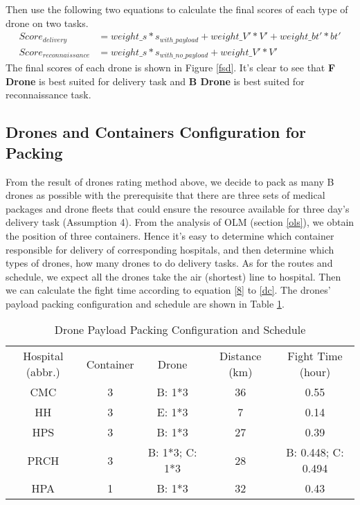 \documentclass{mcmthesis}
\begin{document}
	Then use the following two equations to calculate the final scores of each type of drone on two tasks.
	\begin{align}
	Score_{delivery}&=weight\_s * s_{with\_payload} + weight\_V' * V' + weight\_bt' * bt' \\
	Score_{reconnaissance}&=weight\_s * s_{with\_no\_payload} + weight\_V' * V'
	\end{align}
	The final scores of each drone is shown in Figure \ref{fsd}. It's clear to see that \textbf{F Drone} is best suited for delivery task and \textbf{B Drone} is best suited for reconnaissance task.
	
	\subsection {Drones and Containers  Configuration for Packing}
	From the result of drones rating method above, we decide to pack as many B drones as possible with the prerequisite that there are three sets of medical packages and drone fleets that could ensure the resource available for three day's delivery task (Assumption 4). From the analysis of OLM (section \ref{ols}), we obtain the position of three containers. Hence it's easy to determine which container responsible for delivery of corresponding hospitals, and then determine which types of drones, how many drones to do delivery tasks. As for the routes and schedule, we expect all the drones take the air (shortest) line to hospital. Then we can calculate the fight time according to equation \ref{8} to \ref{dc}. The drones' payload packing configuration and schedule are shown in Table \ref{dcp}. 
	\begin{table}[H]
		\centering
		
		\begin{tabular}{lllcc}
			\cline{1-5}
			
			\multicolumn{1}{c}{Hospital (abbr.)}  & \multicolumn{1}{c}{Container}         & \multicolumn{1}{c}{Drone} & \multicolumn{1}{c}{Distance (km)}     & \multicolumn{1}{c}{Fight Time (hour)} \\
			\cline{1-5}
			
			\multicolumn{1}{c}{CMC}  & \multicolumn{1}{c}{3}  &\multicolumn{1}{c}{B: 1*3}    & 36 & 0.55   \\
			\multicolumn{1}{c}{HH}   & \multicolumn{1}{c}{3}  &\multicolumn{1}{c}{E: 1*3}    & 7 &  0.14  \\
			\multicolumn{1}{c}{HPS}  & \multicolumn{1}{c}{3}  &\multicolumn{1}{c}{B: 1*3}  & 27 & 0.39 \\ 
 			\multicolumn{1}{c}{PRCH} & \multicolumn{1}{c}{3}  &\multicolumn{1}{c}{B: 1*3;  C: 1*3}  & 28 & B: 0.448; C: 0.494     \\
 			\multicolumn{1}{c}{HPA}  & \multicolumn{1}{c}{1}  &\multicolumn{1}{c}{B: 1*3}   & 32  & 0.43  \\ 			
			\cline{1-5}
			
		\end{tabular}
		\caption{Drone Payload Packing Configuration and Schedule}
		\label{dcp}
	\end{table}
\end{document}
